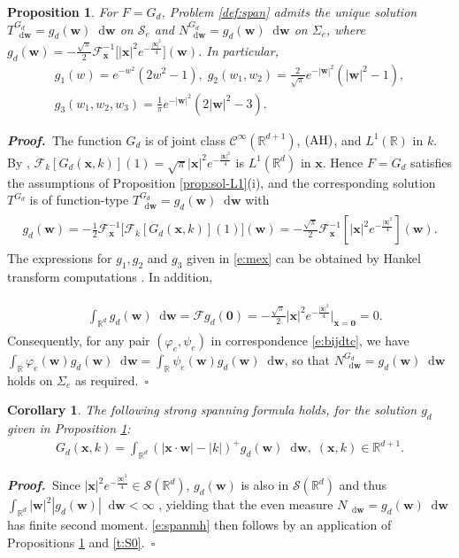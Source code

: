 \documentclass[11pt,A4,twoside]{article}
\numberwithin{equation}{section}
\newcommand{\F}{\mathcal{F}}
\newcommand{\Fi}{\mathcal{F}^{-1}}
\renewcommand*\d{\mathop{}\!\mathrm{d}}
\newcommand{\x}{\mathbf{x}}
\newcommand{\w}{\mathbf{w}}
\newcommand{\R}{\mathbbm{R}}
\renewcommand{\S}{\mathcal{S}}
\newcommand{\M}{\Sigma}
\newcommand{\C}{\mathcal{C}}
\newcommand{\intRd}{\int_{\R^d}}
\def\bel{\begin{eqnarray*}\begin{aligned}}
\def\eel{\end{aligned}\end{eqnarray*}}
\newcommand{\beqa}{\begin{eqnarray}}
\newcommand{\eeqa}{\end{eqnarray}}
\def\bal{\begin{aligned}}
\def\eal{\end{aligned}}
\def\bll#1{
\beqa\label{#1}\bal
}\def\lel{\eal\eeqa}
\newcommand{\beql}[1]{\bll{#1}}
\newcommand{\eeql}{\lel}
\newtheorem{proposition}[theorem]{Proposition}
\newtheorem{corollary}[theorem]{Corollary}
\theoremstyle{definition}
\theoremstyle{remark}
\def\sp{,\;}
\def\AHl{{\rm AHa}\xspace}\def\AHl{{\rm (AH)}\xspace}
\def\R{\mathbb{R}}
\def\varphie{\varphi_e}
\def\finproof {$\Box$ \vskip 5 pt }\def\finproof{\rule{4pt}{6pt}}\def\finproof{\ensuremath{\square}}
\def\proof{\noindent \emph{\textbf{Proof.} $\, $}}
\begin{document}
\begin{proposition}\label{e:Mdkk}
For $F=G_d$, Problem \ref{def:span} admits the unique solution $T^{G_d}_{\d \w}=
g_d(\w) \d \w$ on $\S_e$ and  $
N^{G_d}_{\d \w}= g_d(\w) \d \w$ on $\M_e$, where $g_d(\w)=-\frac{\sqrt{\pi}}{2}\Fi_\x\big[|\x|^2e^{-\frac{|\x|^2}{4}}\big](\w)$. In particular,
\begin{equation}\label{e:mex}
 \begin{gathered}
    g_1 (w) = e^{-{w^2}}(2w^2-1) \sp  g_2 (w_1,w_2) = \frac{2}{\sqrt{\pi}}e^{-|\w|^2}(|\w|^2-1),\\
    g_3 (w_1,w_2,w_3) = \frac{1}{\pi}e^{-|\w|^2}(2|\w|^2-3).   
\end{gathered}
\end{equation}
 \end{proposition}
  

\proof The function $G_d$ is of joint class $\C^\infty(\R^{d+1})$, $\AHl$, and $L^1(\R)$ in $k$. By \citet[Example page 139]{kammler2008},
$\F_{k}[G_d(\x,k)](1) = \sqrt{\pi}|\x|^2e^{-\frac{|\x|^2}{4}}$ is $L^1(\R^d)$ in $\x$. Hence $F=G_d$ satisfies the assumptions of Proposition \ref{prop:sol-L1}(i), and the corresponding solution $T^{G_d}$ is of function-type  $T^{G_d}_{\d\w}= g_d (\w)\d\w$ with
\bel
 g_d (\w) = -\frac{1}{2}\F^{-1}_\x\big[\F_k[ G_d(\x,k)](1)\big] (\w) = -\frac{\sqrt{\pi}}{2}\Fi_\x\left[|\x|^2e^{-\frac{|\x|^2}{4}}\right](\w).
\eel
The expressions for $g_1,g_2$ and $g_3$ given in \eqref{e:mex} can be obtained by Hankel transform computations \citep[Theorem 4.1 page 93]{iosevich2014decay}. In addition,
\beql{eq:me3}
&\intRd g_d(\w) \d \w = \F g_d(\mathbf 0) =  -\frac{\sqrt{\pi}}{2} |\x|^2e^{-\frac{|\x|^2}{4}}\Big|_{\x = \mathbf{0}} = 0 .
\eeql
Consequently, for any pair $(\varphie, \psi_e)$ in correspondence \eqref{e:bijdtc}, we have $ \int_{\R} \varphie (\w) g_d(\w)\d \w =  \int_{\R} \psi_e(\w) g_d(\w)\d \w$, so that 
$N^{G_d}_{\d\w}=    g_d(\w)\d \w$ holds on $\M_e$ as required.\ \finproof  

\begin{corollary}\label{ex:Mex2}
The following strong spanning formula holds, for the solution $g_d$ given in Proposition \ref{e:Mdkk}:
\begin{align}\label{e:spanmh}
    G_d(\x, k) = \int_{\R^d} (|\x \cdot \w| - |k|)^+ g_d (\w) \d \w \sp (\x,k) \in \R^{d+1}  .
\end{align}
\end{corollary}
\proof  Since $|\x|^2e^{-\frac{|\x|^2}{4}}\in \S(\R^d)$, $g_d(\w)$ is also in $\S(\R^d)$ and thus $ \intRd |\w|^2 | g_d(\w) |\d\w<\infty$ \cite[Theorem page 141]{kanwal}, yielding that the even measure $ N_{\d \w} = g_d(\w)\d\w $ has finite second moment.  \eqref{e:spanmh}  then follows by an application of Propositions \ref{e:Mdkk} and \ref{t:S0}.\ \finproof
\end{document}
